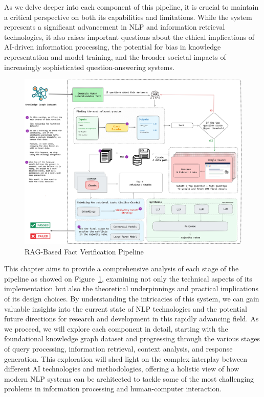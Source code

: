 As we delve deeper into each component of this pipeline, it is crucial to maintain a critical perspective on both its capabilities and limitations.
While the system represents a significant advancement in NLP and information retrieval technologies, it also raises important questions about the ethical implications of AI-driven information processing, the potential for bias in knowledge representation and model training, and the broader societal impacts of increasingly sophisticated question-answering systems.

\begin{figure}[ht!]
    \centering
    \begin{minipage}[b]{\textwidth}
        \centering
        \includegraphics[width=\textwidth]{res/pipeline}
        \caption{RAG-Based Fact Verification Pipeline}
        \label{fig:pipeline}
    \end{minipage}
\end{figure}

This chapter aims to provide a comprehensive analysis of each stage of the pipeline as showed on Figure~\ref{fig:pipeline}, examining not only the technical aspects of its implementation but also the theoretical underpinnings and practical implications of its design choices.
By understanding the intricacies of this system, we can gain valuable insights into the current state of NLP technologies and the potential future directions for research and development in this rapidly advancing field.
As we proceed, we will explore each component in detail, starting with the foundational knowledge graph dataset and progressing through the various stages of query processing, information retrieval, context analysis, and response generation.
This exploration will shed light on the complex interplay between different AI technologies and methodologies, offering a holistic view of how modern NLP systems can be architected to tackle some of the most challenging problems in information processing and human-computer interaction.

